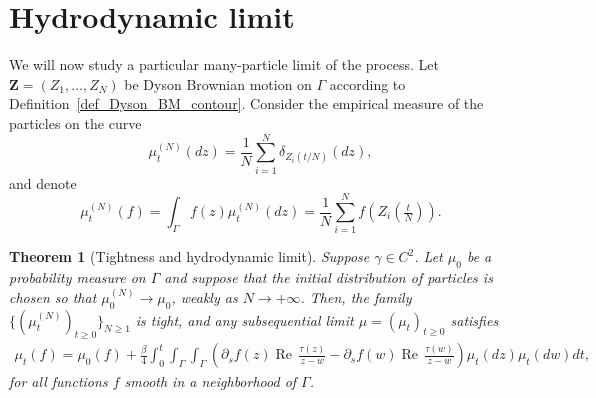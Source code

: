 \documentclass[11pt]{article}
\renewcommand{\Re}{\operatorname{Re}\,}
\numberwithin{equation}{section}
\newtheorem{theorem}{Theorem}[section]
\theoremstyle{definition}
\begin{document}
\section{Hydrodynamic limit}\label{sec::hydro}
We will now study a particular many-particle limit of the process.
Let $\boldsymbol{Z}=(Z_{1},\dots,Z_{N})$ be Dyson Brownian motion on $\Gamma$ according to Definition~\ref{def_Dyson_BM_contour}.  Consider the empirical measure of the particles on the curve
\[
    \mu_{t}^{(N)}(dz) = \frac{1}{N}\sum\limits_{i=1}^{N}\delta_{Z_{i}(t/N)}(dz),
\]
and denote 
\[
    \mu_{t}^{(N)}(f) = \int_\Gamma f(z)\mu_{t}^{(N)}(dz) = \frac{1}{N}\sum\limits_{i=1}^{N}f(Z_{i}(\tfrac{t}{N})).
\]
\begin{theorem}[Tightness and hydrodynamic limit]\label{thm::hydro_limit}
Suppose $\gamma \in C^2$. Let $\mu_{0}$ be a probability measure on $\Gamma$ and suppose that the initial distribution of particles is chosen so that $\mu_{0}^{(N)}\to \mu_{0}$, weakly as $N\to+\infty$. Then, the family $\{(\mu_{t}^{(N)})_{t\ge 0}\}_{N\ge 1}$ is tight, and any subsequential limit $\mu= (\mu_{t})_{t\ge0}$ satisfies
\begin{align}\label{eqn::hydro_SDE_2}
    \mu_{t}(f) = \mu_0(f) + \frac{\beta}{4}\int_0^t\int_\Gamma\int_\Gamma\left(\partial_s f(z)\Re\frac{\tau(z)}{z-w}-\partial_s f(w)\Re\frac{\tau(w)}{z-w}\right)\mu_t(dz)\mu_t(dw)dt,
\end{align}
for all functions $f$ smooth in a neighborhood of $\Gamma$.
\end{theorem}
\end{document}
